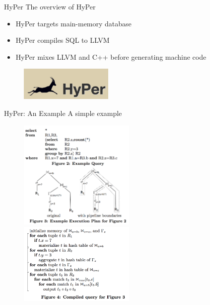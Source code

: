 \begin{frame}{HyPer}
The overview of HyPer
\begin{itemize}
\item HyPer targets main-memory database
\item HyPer compiles SQL to LLVM
\item HyPer mixes LLVM and C++ before generating machine code
\end{itemize}
\begin{figure}[htb]
\includegraphics[width=0.4\textwidth]{fig/hyper-logo.png}
\end{figure}
\end{frame}

\begin{frame}{HyPer: An Example}
A simple example
\begin{figure}[htb]
\includegraphics[width=0.5\textwidth]{fig/hyper-fig2.png}
\includegraphics[width=0.5\textwidth]{fig/hyper-fig4.png}
\end{figure}
\end{frame}

